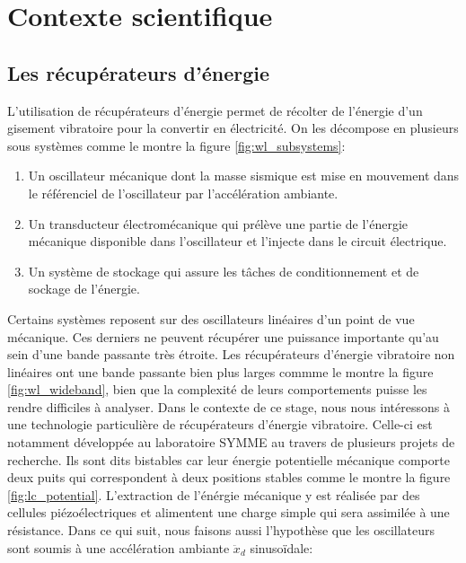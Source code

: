 \documentclass[a4paper, french, 12pt, titlepage]{article}
\begin{document}
\newpage

\section{Contexte scientifique}


\subsection{Les récupérateurs d'énergie}





L'utilisation de récupérateurs d'énergie permet de récolter de l'énergie d'un gisement vibratoire pour la convertir en électricité.
On les décompose en plusieurs sous systèmes comme le montre la figure \ref{fig:wl_subsystems}:
\begin{enumerate}
  \item Un oscillateur mécanique dont la masse sismique est mise en mouvement dans le référenciel de l'oscillateur par l'accélération ambiante.
  \item Un transducteur électromécanique qui prélève une partie de l'énergie mécanique disponible dans l'oscillateur et l'injecte dans le circuit électrique.
  \item Un système de stockage qui assure les tâches de conditionnement et de sockage de l'énergie.
\end{enumerate}

Certains systèmes reposent sur des oscillateurs linéaires d'un point de vue mécanique.
Ces derniers ne peuvent récupérer une puissance importante qu'au sein d'une bande passante très étroite.
Les récupérateurs d'énergie vibratoire non linéaires ont une bande passante bien plus larges commme le montre la figure \ref{fig:wl_wideband}, bien que la complexité de leurs comportements puisse les rendre difficiles à analyser.
Dans le contexte de ce stage, nous nous intéressons à une technologie particulière de récupérateurs d'énergie vibratoire.
Celle-ci est notamment développée au laboratoire SYMME au travers de plusieurs projets de recherche.
Ils sont dits bistables car leur énergie potentielle mécanique comporte deux puits qui correspondent à deux positions stables comme le montre la figure \ref{fig:lc_potential}.
L'extraction de l'énérgie mécanique y est réalisée par des cellules piézoélectriques et alimentent une charge simple qui sera assimilée à une résistance.
Dans ce qui suit, nous faisons aussi l'hypothèse que les oscillateurs sont soumis à une accélération ambiante $\ddot x_d$ sinusoïdale:
\end{document}
